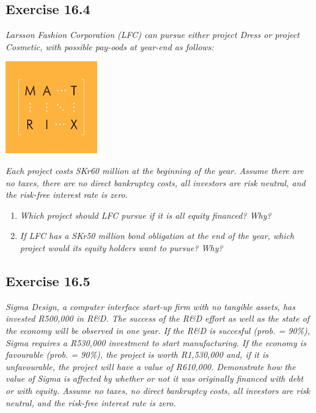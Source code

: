 \documentclass[]{book}
\theoremstyle{definition}
\theoremstyle{definition}
\theoremstyle{remark}
\begin{document}
\subsection{Exercise 16.4}\label{exercise-16.4}

\emph{Larsson Fashion Corporation (LFC) can pursue either project Dress
or project Cosmetic, with possible pay-oods at year-end as follows:}
\citep[p.551]{book}

\begin{center}\includegraphics[width=150px]{figures/matrix} \end{center}

\emph{Each project costs SKr60 million at the beginning of the year.
Assume there are no taxes, there are no direct bankruptcy costs, all
investors are risk neutral, and the risk-free interest rate is zero.}
\citep[p.551]{book}

\begin{enumerate}
\def\labelenumi{\alph{enumi}.}
\item
  \emph{Which project should LFC pursue if it is all equity financed?
  Why?} \citep[p.551]{book}
\item
  \emph{If LFC has a SKr50 million bond obligation at the end of the
  year, which project would its equity holders want to pursue? Why?}
  \citep[p.551]{book}
\end{enumerate}

\subsection{Exercise 16.5}\label{exercise-16.5}

\emph{Sigma Design, a computer interface start-up firm with no tangible
assets, has invested R500,000 in R\&D. The success of the R\&D effort as
well as the state of the economy will be observed in one year. If the
R\&D is succesful (prob. = 90\%), Sigma requires a R530,000 investment
to start manufacturing. If the economy is favourable (prob. = 90\%), the
project is worth R1,530,000 and, if it is unfavourable, the project will
have a value of R610,000. Demonstrate how the value of Sigma is affected
by whether or not it was originally financed with debt or with equity.
Assume no taxes, no direct bankruptcy costs, all investors are risk
neutral, and the risk-free interest rate is zero.} \citep[p.551]{book}
\end{document}
